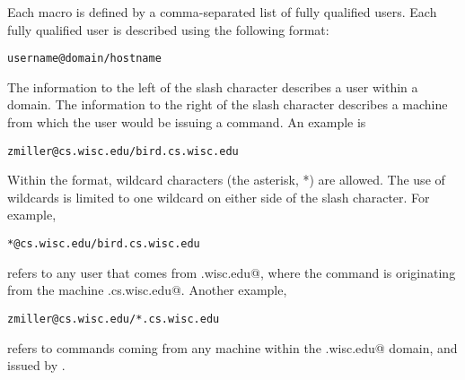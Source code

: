 
Each macro is defined by a comma-separated list of fully qualified
users.
Each
fully qualified user
is described using the following format:
\begin{verbatim}
username@domain/hostname
\end{verbatim}
The information to the left of the slash character describes
a user within a domain.
The information to the right of the slash character describes
a machine from which the user would be issuing a command. 
An example is
\begin{verbatim}
zmiller@cs.wisc.edu/bird.cs.wisc.edu
\end{verbatim}

Within the format, wildcard characters (the asterisk, *) are allowed.
The use of wildcards is limited to one wildcard on either side
of the slash character.
For example,
\begin{verbatim}
*@cs.wisc.edu/bird.cs.wisc.edu
\end{verbatim}
refers to any user that comes from \verb@cs.wisc.edu@,
where the command is originating from the machine
\verb@bird.cs.wisc.edu@.
Another example,
\begin{verbatim}
zmiller@cs.wisc.edu/*.cs.wisc.edu
\end{verbatim}
refers to commands coming from any machine within the 
\verb@cs.wisc.edu@ domain, and issued by \verb@zmiller@.






